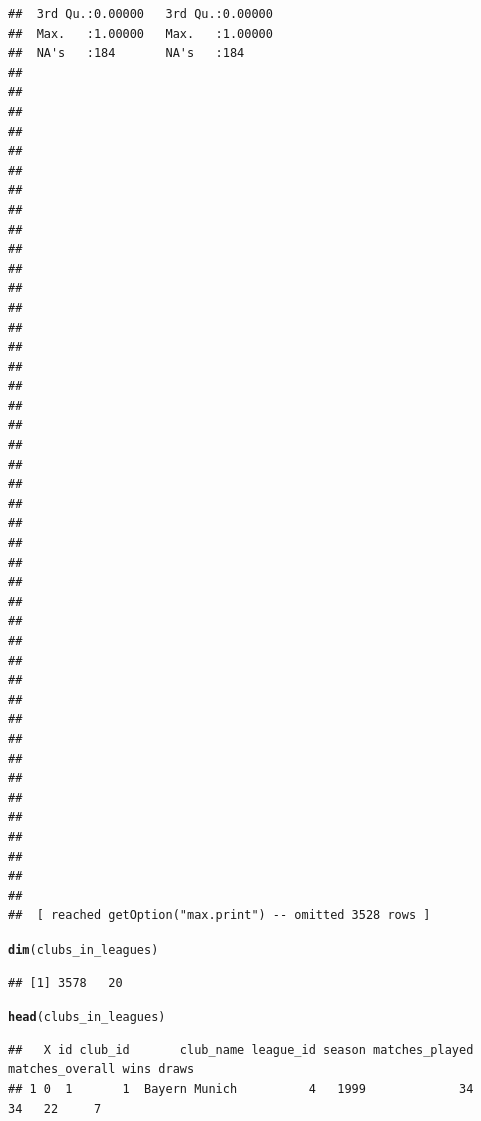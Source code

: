 \documentclass{article}\usepackage[]{graphicx}\usepackage[]{color}
\makeatletter
\newcommand{\hlstd}[1]{\textcolor[rgb]{0.345,0.345,0.345}{#1}}%
\newcommand{\hlkwd}[1]{\textcolor[rgb]{0.737,0.353,0.396}{\textbf{#1}}}%
\newenvironment{kframe}{%
 \def\at@end@of@kframe{}%
 \ifinner\ifhmode%
  \def\at@end@of@kframe{\end{minipage}}%
  \begin{minipage}{\columnwidth}%
 \fi\fi%
 \def\FrameCommand##1{\hskip\@totalleftmargin \hskip-\fboxsep
 \colorbox{shadecolor}{##1}\hskip-\fboxsep
     \hskip-\linewidth \hskip-\@totalleftmargin \hskip\columnwidth}%
 \MakeFramed {\advance\hsize-\width
   \@totalleftmargin\z@ \linewidth\hsize
   \@setminipage}}%
 {\par\unskip\endMakeFramed%
 \at@end@of@kframe}
\newenvironment{knitrout}{}{} %
\makeatother
\begin{document}
\begin{knitrout}
\begin{kframe}
\begin{verbatim}
##  3rd Qu.:0.00000   3rd Qu.:0.00000  
##  Max.   :1.00000   Max.   :1.00000  
##  NA's   :184       NA's   :184      
##                                     
##                                     
##                                     
##                                     
##                                     
##                                     
##                                     
##                                     
##                                     
##                                     
##                                     
##                                     
##                                     
##                                     
##                                     
##                                     
##                                     
##                                     
##                                     
##                                     
##                                     
##                                     
##                                     
##                                     
##                                     
##                                     
##                                     
##                                     
##                                     
##                                     
##                                     
##                                     
##                                     
##                                     
##                                     
##                                     
##                                     
##                                     
##                                     
##                                     
##                                     
##                                     
##                                     
##  [ reached getOption("max.print") -- omitted 3528 rows ]
\end{verbatim}
\begin{alltt}
\hlkwd{dim}\hlstd{(clubs_in_leagues)}
\end{alltt}
\begin{verbatim}
## [1] 3578   20
\end{verbatim}
\begin{alltt}
\hlkwd{head}\hlstd{(clubs_in_leagues)}
\end{alltt}
\begin{verbatim}
##   X id club_id       club_name league_id season matches_played matches_overall wins draws
## 1 0  1       1  Bayern Munich          4   1999             34              34   22     7

\end{verbatim}
\end{kframe}
\end{knitrout}
\end{document}
